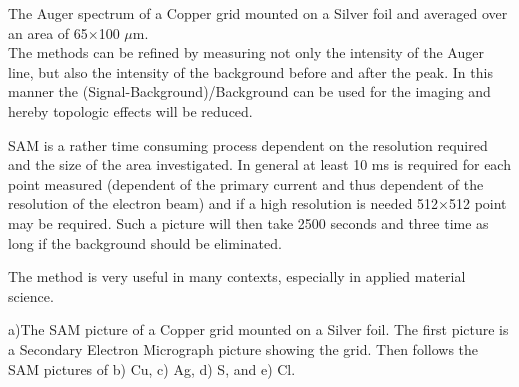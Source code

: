   \newpage
          \vspace*{12cm}

          The Auger spectrum of  a  Copper
         grid mounted on a Silver foil and averaged over  an  area  of
         65$\times$100 $\mu$m.\\

             The methods can be refined  by  measuring  not  only  the
          intensity of the Auger line, but also the intensity  of  the
          background before and after the peak.  In  this  manner  the
          (Signal-Background)/Background can be used for  the  imaging
          and hereby topologic effects will be reduced.

          SAM is a rather time  consuming  process  dependent  on  the
          resolution required and the size of the  area  investigated.
          In general at  least  10  ms  is  required  for  each  point
          measured  (dependent  of  the  primary  current   and   thus
          dependent of the resolution of the electron beam) and  if  a
          high resolution is needed 512$\times$512  point  may  be  required.
          Such a picture will then take 2500 seconds  and  three  time  as
          long  if the background should be eliminated.

          The method is very useful in many  contexts,  especially  in
          applied material science.\\
          \newpage

          \vspace*{18cm}

           a)The SAM picture of a Copper grid
          mounted on a Silver foil. The first picture is  a  Secondary
          Electron Micrograph picture showing the  grid.  Then  follows
          the SAM pictures of b) Cu, c) Ag, d) S, and e) Cl. 

               \newpage

